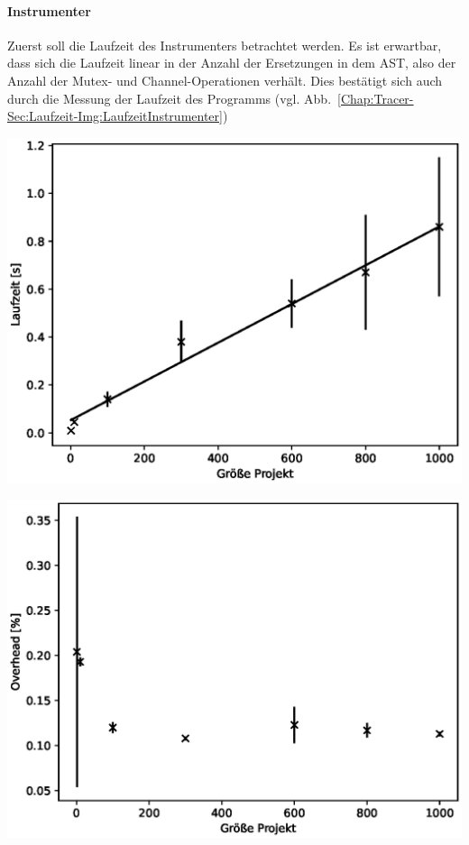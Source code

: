 \paragraph{Instrumenter} Zuerst soll die Laufzeit des Instrumenters betrachtet 
werden. Es ist erwartbar, 
dass sich die Laufzeit linear in der Anzahl der Ersetzungen in dem AST, also 
der Anzahl der Mutex- und Channel-Operationen verhält. Dies bestätigt sich auch durch 
die Messung der Laufzeit des Programms (vgl. 
Abb.~\ref{Chap:Tracer-Sec:Laufzeit-Img:LaufzeitInstrumenter})\\
\begin{minipage}{0.45\textwidth}
  \centering  
  \includegraphics[width=\textwidth]{img/Runtime_Instrumenter.eps}
  \label{Chap:Tracer-Sec:Laufzeit-Img:LaufzeitInstrumenter}
\end{minipage}
\hfill
\begin{minipage}{0.45\textwidth}
  \centering
  \includegraphics[width=\textwidth]{img/Runtime_Tracer.eps}
  \label{Chap:Trace-Sec:Laufzeit-Img:LaufzeitTracer}
\end{minipage}
